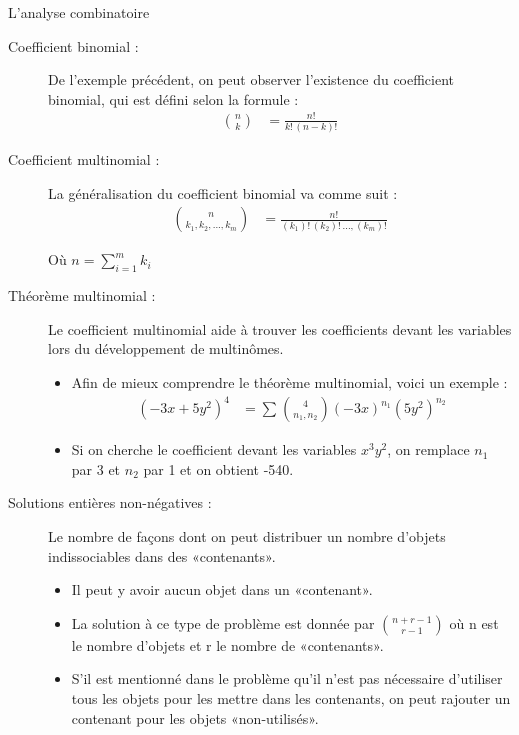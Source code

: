 \documentclass[10pt, french]{article}
\begin{document}
\begin{multicols*}{3}
\begin{probch1}{L'analyse combinatoire}
\begin{description}
	 \item[Coefficient binomial :] De l'exemple précédent, on peut observer l'existence du coefficient binomial, qui est défini selon la formule :
	 \begin{align*}
	 \binom{n}{k}
	 &= \frac{n!}{k! \,(n-k)!}
	 \end{align*}
\end{description}
\begin{description}
  \item[Coefficient multinomial :] La généralisation du coefficient binomial va comme suit :
  \begin{align*}
  \binom{n}{k_1, k_2, ..., k_m}
  &= \frac{n!}{(k_1)! \, (k_2)! \, ..., (k_m)!}
  \end{align*}
  \item[] Où {$n = \sum_{i = 1}^{m} k_i$}
  \item[Théorème multinomial :] Le coefficient multinomial aide à trouver les coefficients devant les variables lors du développement de multinômes. 
  \begin{itemize}
	  \item Afin de mieux comprendre le théorème multinomial, voici un exemple :
	  	\setlength{\mathindent}{-1cm}
		  \begin{align*}
			(-3x+5y^2)^4 
			&=	\sum_{}^{} \binom{4}{n_1 , n_2} (-3x)^{n_1} (5y^{2})^{n_2}
		  \end{align*}
		\setlength{\mathindent}{1cm}
	 \item Si on cherche le coefficient devant les variables $x^{3}y^{2}$, on remplace $n_1$ par 3 et $n_2$ par 1 et on obtient -540.
\end{itemize} 
\end{description}  
\begin{description}
  \item[Solutions entières non-négatives :] Le nombre de façons dont on peut distribuer un nombre d'objets indissociables dans des «contenants». 
	\begin{itemize}
		\item Il peut y avoir aucun objet dans un «contenant». 
		\item La solution à ce type de problème est donnée par $\binom{n+r-1}{r-1}$ où n est le nombre d'objets et r le nombre de «contenants». 
		\item S'il est mentionné dans le problème qu'il n'est pas nécessaire d'utiliser tous les objets pour les mettre dans les contenants, on peut rajouter un contenant pour les objets «non-utilisés».

\end{itemize}
\end{description}
\end{probch1}
\end{multicols*}
\end{document}
